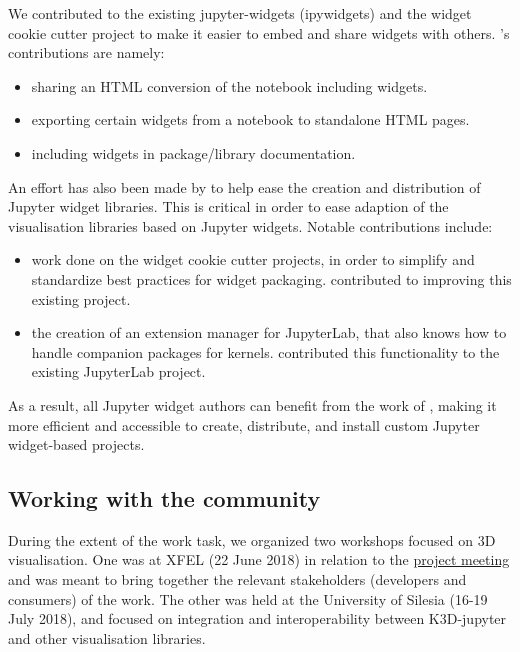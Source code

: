 \documentclass{deliverablereport}
\begin{document}
We contributed to the existing jupyter-widgets (ipywidgets) and the widget cookie
cutter project to make it easier to embed and share widgets with
others. \ODK's contributions are namely:

\begin{itemize}
\item sharing an HTML conversion of the notebook including widgets.
\item exporting certain widgets from a notebook to standalone HTML pages.
\item including widgets in package/library documentation.
\end{itemize}

An effort has also been made by \ODK to help ease the creation and distribution of Jupyter widget libraries. This is critical in order to ease adaption of the visualisation libraries based on Jupyter widgets. Notable contributions include:
\begin{itemize}
\item work done on the widget cookie cutter projects, in order to simplify and standardize best practices for widget packaging. \ODK contributed to improving this existing project.
\item the creation of an extension manager for JupyterLab, that also knows how to handle companion packages for kernels. \ODK contributed this functionality to the existing JupyterLab project.
\end{itemize}

As a result, all Jupyter widget authors can benefit from the work of \ODK,
making it more efficient and accessible to create, distribute,
and install custom Jupyter widget-based projects.



\subsection{Working with the community}\label{community}

During the extent of the work task, we organized two workshops focused on 3D visualisation.
One was at XFEL (22 June 2018) in relation to the \href{https://opendreamkit.org/2018/06/20/Hamburg-DisseminationWorkshop-SteeringMeeting/}{project meeting} and was meant to bring together the relevant stakeholders (developers and consumers) of the work. The other was held at the University of Silesia (16-19 July 2018), and focused on integration and interoperability between K3D-jupyter and other visualisation libraries.
\end{document}
